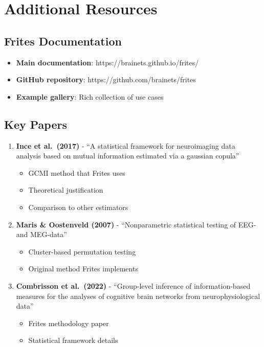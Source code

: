 \documentclass[
  11pt,
  letterpaper,
  oneside,
  openany]{book}
\providecommand{\tightlist}{%
  \setlength{\itemsep}{0pt}\setlength{\parskip}{0pt}}
\begin{document}
\section{Additional Resources}\label{additional-resources-1}

\subsection{Frites Documentation}\label{frites-documentation}

\begin{itemize}
\tightlist
\item
  \textbf{Main documentation}: https://brainets.github.io/frites/
\item
  \textbf{GitHub repository}: https://github.com/brainets/frites
\item
  \textbf{Example gallery}: Rich collection of use cases
\end{itemize}

\subsection{Key Papers}\label{key-papers}

\begin{enumerate}
\def\labelenumi{\arabic{enumi}.}
\tightlist
\item
  \textbf{Ince et al.~(2017)} - ``A statistical framework for
  neuroimaging data analysis based on mutual information estimated via a
  gaussian copula''

  \begin{itemize}
  \tightlist
  \item
    GCMI method that Frites uses
  \item
    Theoretical justification
  \item
    Comparison to other estimators
  \end{itemize}
\item
  \textbf{Maris \& Oostenveld (2007)} - ``Nonparametric statistical
  testing of EEG- and MEG-data''

  \begin{itemize}
  \tightlist
  \item
    Cluster-based permutation testing
  \item
    Original method Frites implements
  \end{itemize}
\item
  \textbf{Combrisson et al.~(2022)} - ``Group-level inference of
  information-based measures for the analyses of cognitive brain
  networks from neurophysiological data''

  \begin{itemize}
  \tightlist
  \item
    Frites methodology paper
  \item
    Statistical framework details
  \end{itemize}
\end{enumerate}
\end{document}
